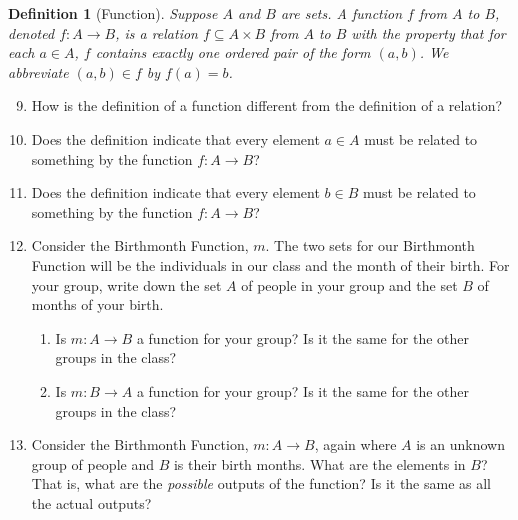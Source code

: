 \documentclass[12 pt]{article}
\newcommand{\esub}{\subseteq}
\theoremstyle{definition}
\theoremstyle{plain}
\theoremstyle{mytheorem}
\theoremstyle{myexample}
\theoremstyle{mydefinition}
\newtheorem*{definition*}{Definition}
\begin{document}
\begin{definition*}[Function]  Suppose $A$ and $B$ are sets.  A \textit{function} $f$ from $A$ to $B$, denoted $f:A \to B$, is a relation $f \esub A \times B$ from $A$ to $B$ with the property that for each $a \in A$, $f$ contains exactly one ordered pair of the form $(a,b)$.  We abbreviate $(a,b) \in f$ by $f(a)=b$.
\end{definition*}
\begin{enumerate} \setcounter{enumi}{8}
\item How is the definition of a function different from the definition of a relation?

\vspace{2in}

\item Does the definition indicate that every element $a \in A$ must be related to something by the function $f: A \to B$?

\vspace{1.5in}

\item Does the definition indicate that every element $b \in B$ must be related to something by the function $f: A \to B$?

\vspace{1.5in}

\item Consider the Birthmonth Function, $m$.  The two sets for our Birthmonth Function will be the individuals in our class and the month of their birth.  For  your group, write down the set $A$ of people in your group and the set $B$ of months of your birth.

\vspace{2in}

	\begin{enumerate}
	\item Is $m: A \to B$ a function for your group?  Is it the same for the other groups in the class?
	
	\vspace{1in}
	
	\item Is $m: B \to A$ a function for your group?  Is it the same for the other groups in the class?
	
	\vspace{1in}
	
	\end{enumerate}
\item Consider the Birthmonth Function, $m: A \to B$, again where $A$ is an unknown group of people and $B$ is their birth months.  What are the elements in $B$?  That is, what are the \textit{possible} outputs of the function?  Is it the same as all the actual outputs?


\end{enumerate}
\end{document}
